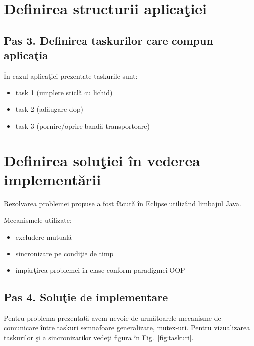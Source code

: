 \documentclass[a4paper, 11pt]{article}
\begin{document}
\section{Definirea structurii aplica\c{t}iei}



\subsection{ Pas 3. Definirea taskurilor care compun aplica\c{t}ia}

\^{I}n cazul aplica\c{t}iei prezentate taskurile sunt:

\begin{itemize}
\item task 1 (umplere sticl\u{a} cu lichid)
\item task 2 (ad\u{a}ugare dop)
\item task 3 (pornire/oprire band\u{a} transportoare)
\end{itemize}
 


\section{Definirea solu\c{t}iei \^{i}n vederea implement\u{a}rii}

\hspace{2pc}Rezolvarea problemei propuse a fost f\u{a}cut\u{a} \^{i}n Eclipse utiliz\^{a}nd limbajul Java.
\begin{flushleft}
Mecanismele utilizate:
\end{flushleft}

\begin{itemize}
    \item excludere mutual\u{a}
    \item sincronizare pe condi\c{t}ie de timp
    \item \^{i}mp\u{a}r\c{t}irea problemei \^{i}n clase conform paradigmei OOP
\end{itemize}

\subsection{Pas 4. Solu\c{t}ie de implementare}

\hspace{2pc}Pentru problema prezentat\u{a} avem nevoie de urm\u{a}toarele mecanisme de comunicare \^{i}ntre taskuri semnafoare generalizate, mutex-uri.
Pentru vizualizarea taskurilor \c{s}i a sincronizarilor vede\c{t}i figura \^{i}n Fig.~\ref{fig:taskuri}.
\end{document}

